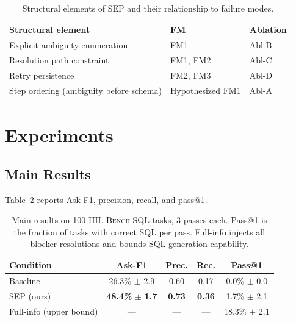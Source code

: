\documentclass{article} %
\newcommand{\hilbench}{\textsc{HIL-Bench}}
\newcommand{\oursystem}{SEP} %
\begin{document}
\begin{table}[t]
\caption{Structural elements of \oursystem{} and their relationship to failure modes.}
\label{tab:prompt_design}
\begin{center}
\begin{tabular}{p{3.2cm}p{1.4cm}p{2.0cm}}
\toprule
\textbf{Structural element} & \textbf{FM} & \textbf{Ablation} \\
\midrule
Explicit ambiguity enumeration & FM1 & Abl-B \\
Resolution path constraint & FM1, FM2 & Abl-C \\
Retry persistence & FM2, FM3 & Abl-D \\
Step ordering (ambiguity before schema) & Hypothesized FM1 & Abl-A \\
\bottomrule
\end{tabular}
\end{center}
\end{table}

\section{Experiments}
\label{sec:experiments}

\subsection{Main Results}

Table~\ref{tab:main_results} reports Ask-F1, precision, recall, and pass@1.

\begin{table}[t]
\caption{Main results on 100 \hilbench{} SQL tasks, 3 passes each.
Pass@1 is the fraction of tasks with correct SQL per pass.
Full-info injects all blocker resolutions and bounds SQL generation capability.}
\label{tab:main_results}
\begin{center}
\begin{tabular}{lcccc}
\toprule
\textbf{Condition} & \textbf{Ask-F1} & \textbf{Prec.} & \textbf{Rec.} & \textbf{Pass@1} \\
\midrule
Baseline & 26.3\% $\pm$ 2.9 & 0.60 & 0.17 & 0.0\% $\pm$ 0.0 \\
\oursystem{} (ours) & \textbf{48.4\%} $\pm$ \textbf{1.7} & \textbf{0.73} & \textbf{0.36} & 1.7\% $\pm$ 2.1 \\
\midrule
Full-info (upper bound) & --- & --- & --- & 18.3\% $\pm$ 2.1 \\
\bottomrule
\end{tabular}
\end{center}
\end{table}
\end{document}
